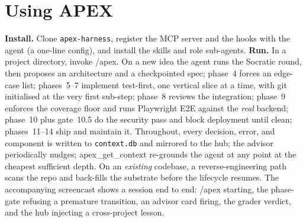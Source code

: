 \documentclass[sigconf,review,anonymous=false]{acmart}
\begin{document}
\section{Using APEX}
\textbf{Install.} Clone \texttt{apex-harness}, register the MCP server and the
hooks with the agent (a one-line config), and install the skills and role
sub-agents. \textbf{Run.} In a project directory, invoke \textsf{/apex}. On a new
idea the agent runs the Socratic round, then proposes an architecture and a
checkpointed spec; phase~4 forces an edge-case list; phases~5--7 implement
test-first, one vertical slice at a time, with git initialised at the very first
sub-step; phase~8 reviews the integration; phase~9 enforces the coverage floor and
runs Playwright E2E against the \emph{real} backend; phase~10 plus gate~10.5 do the
security pass and block deployment until clean; phases~11--14 ship and maintain it.
Throughout, every decision, error, and component is written to \texttt{context.db}
and mirrored to the hub; the advisor periodically nudges; \textsf{apex\_get\_context}
re-grounds the agent at any point at the cheapest sufficient depth. On an
\emph{existing} codebase, a reverse-engineering path scans the repo and back-fills
the substrate before the lifecycle resumes. The accompanying screencast shows a
session end to end: \textsf{/apex} starting, the phase-gate refusing a premature
transition, an advisor card firing, the grader verdict, and the hub injecting a
cross-project lesson.

\end{document}
